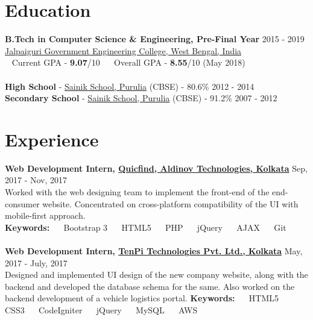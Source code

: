 \documentclass[margin, centered]{res}
\begin{document}
\begin{resume}

\section{Education}
\textbf{B.Tech in Computer Science \& Engineering, Pre-Final Year} \hfill 2015 - 2019 \\
\href{http://jgec.ac.in/}{Jalpaiguri Government Engineering College, West Bengal, India} \\
\hspace*{0.6em}\textbullet~ Current GPA - \textbf{9.07}/10 ~\textbullet~ Overall GPA - \textbf{8.55}/10 (May 2018)
\\
\\
\textbf{High School} - \href{http://sainikschoolpurulia.com/}{Sainik School, Purulia} (CBSE) - 80.6\% \hfill 2012 - 2014 \\
\textbf{Secondary School} - \href{http://sainikschoolpurulia.com/}{Sainik School, Purulia} (CBSE) - 91.2\% \hfill 2007 - 2012
 
\section{Experience}
\textbf{Web Development Intern, \href{http://www.quicfind.com}{Quicfind, Aldinov Technologies, Kolkata}} \hfill Sep, 2017 - Nov, 2017\\
Worked with the web designing team to implement the front-end of the end-consumer website. Concentrated on cross-platform compatibility of the UI with mobile-first approach.\\
\textbf{Keywords:} ~\textbullet~ Bootstrap 3 ~\textbullet~ HTML5 ~\textbullet~ PHP ~\textbullet~ jQuery ~\textbullet~ AJAX ~\textbullet~ Git\\
\\
\textbf{Web Development Intern, \href{http://www.tenpitech.com/}{TenPi Technologies Pvt. Ltd., Kolkata}} \hfill May, 2017 - July, 2017\\
Designed and implemented UI design of the new company website, along with the backend and developed the database schema for the same. Also worked on the backend development of a vehicle logistics portal.
\textbf{Keywords:} ~\textbullet~ HTML5 ~\textbullet~ CSS3 ~\textbullet~ CodeIgniter ~\textbullet~ jQuery ~\textbullet~ MySQL ~\textbullet~ AWS

\end{resume}
\end{document}
